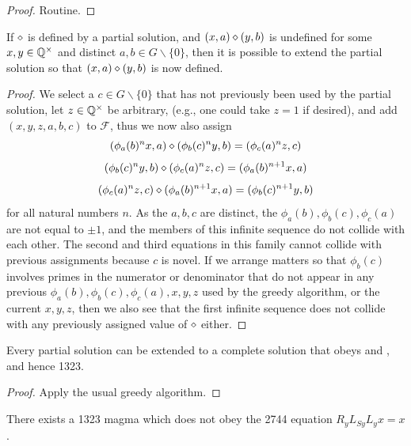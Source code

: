 \begin{proof} Routine.
\end{proof}

\begin{lemma}\label{greedy-1323}  If $\diamond$ is defined by a partial solution, and $(x,a) \diamond (y,b)$ is undefined for some $x,y \in \mathbb{Q}^\times$ and distinct $a,b \in G \backslash \{0\}$, then it is possible to extend the partial solution so that $(x,a) \diamond (y,b)$ is now defined.
\end{lemma}

\begin{proof} We select a $c \in G \backslash \{0\}$ that has not previously been used by the partial solution, let $z \in \mathbb{Q}^\times$ be arbitrary, (e.g., one could take $z=1$ if desired), and add $(x,y,z,a,b,c)$ to ${\mathcal F}$, thus we now also assign
$$ (\phi_a(b)^n x,a) \diamond (\phi_b(c)^n y,b) = (\phi_c(a)^n z,c)$$
$$ (\phi_b(c)^n y,b) \diamond (\phi_c(a)^n z,c) = (\phi_a(b)^{n+1} x, a)$$
$$ (\phi_c(a)^n z,c) \diamond (\phi_a(b)^{n+1} x, a) = (\phi_b(c)^{n+1} y,b)$$
for all natural numbers $n$.  As the $a,b,c$ are distinct, the $\phi_a(b), \phi_b(c), \phi_c(a)$ are not equal to $\pm 1$, and the members of this infinite sequence do not collide with each other.  The second and third equations in this family cannot collide with previous assignments because $c$ is novel.  If we arrange matters so that $\phi_b(c)$ involves primes in the numerator or denominator that do not appear in any previous $\phi_a(b), \phi_b(c), \phi_c(a), x, y, z$ used by the greedy algorithm, or the current $x,y,z$, then we also see that the first infinite sequence does not collide with any previously assigned value of $\diamond$ either.
\end{proof}

\begin{corollary}\label{greedy-iterate}  Every partial solution can be extended to a complete solution that obeys  and , and hence 1323.
\end{corollary}

\begin{proof} Apply the usual greedy algorithm.
\end{proof}

\begin{corollary}\label{1323-refute-2744}  There exists a 1323 magma which does not obey the 2744 equation $R_y L_{Sy} L_y x = x$.
\end{corollary}


